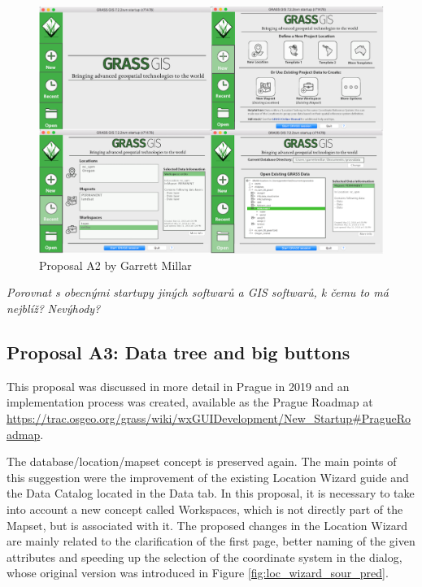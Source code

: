 \documentclass[a4paper,10pt,twoside]{article}
\begin{document}
\vspace{0.3cm}
\begin{figure}[hbt!] 
\begin{center}
\includegraphics[width=15cm]{../pictures/proposalA2.png} 
\caption[Proposal A2 by Garrett Millar]{Proposal A2 by Garrett Millar}
\label{fig:proposalA2}
\end{center}
\end{figure}

\textit{\color{red} Porovnat s obecnými startupy jiných softwarů a GIS softwarů, k čemu to má nejblíž?}
\textit{\color{red} Nevýhody?}

\subsection{Proposal A3: Data tree and big buttons}

This proposal was discussed in more detail in Prague in 2019 and an implementation process was created, available as the Prague Roadmap at \url{https://trac.osgeo.org/grass/wiki/wxGUIDevelopment/New\_Startup\#PragueRoadmap}.

The database/location/mapset concept is preserved again. The main points of this suggestion were the improvement of the existing Location Wizard guide and the Data Catalog located in the Data tab. In this proposal, it is necessary to take into account a new concept called Workspaces, which is not directly part of the Mapset, but is associated with it. The proposed changes in the Location Wizard are mainly related to the clarification of the first page, better naming of the given attributes and speeding up the selection of the coordinate system in the dialog, whose original version was introduced in Figure \ref{fig:loc_wizard_sour_pred}.
\end{document}
